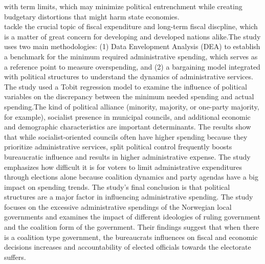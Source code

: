 with term limits, which may minimize political entrenchment while creating budgetary distortions that might harm state economies.\\
  tackle the crucial topic of fiscal expenditure and long-term fiscal discpline, which is a matter of great concern for developing and developed nations alike.The study uses two main methodologies: (1) Data Envelopment Analysis (DEA) to establish a benchmark for the minimum required administrative spending, which serves as a reference point to measure overspending, and (2) a bargaining model integrated with political structures to understand the dynamics of administrative services. The study used a Tobit regression model to examine the influence of political variables on the discrepancy between the minimum needed spending and actual spending.The kind of political alliance (minority, majority, or one-party majority, for example), socialist presence in municipal councils, and additional economic and demographic characteristics are important determinants. The results show that while socialist-oriented councils often have higher spending because they prioritize administrative services, split political control frequently boosts bureaucratic influence and results in higher administrative expense. The study emphasizes how difficult it is for voters to limit administrative expenditures through elections alone because coalition dynamics and party agendas have a big impact on spending trends. The study's final conclusion is that political structures are a major factor in influencing administrative spending. The study focuses on the excessive administrative spendings of the Norwegian local governments and examines the impact of different ideologies of ruling government and the coalition form of the government. Their findings suggest that when there is a coalition type government, the bureaucrats influences on fiscal and economic decisions increases and accountability of elected officials towards the electorate suffers.\\
